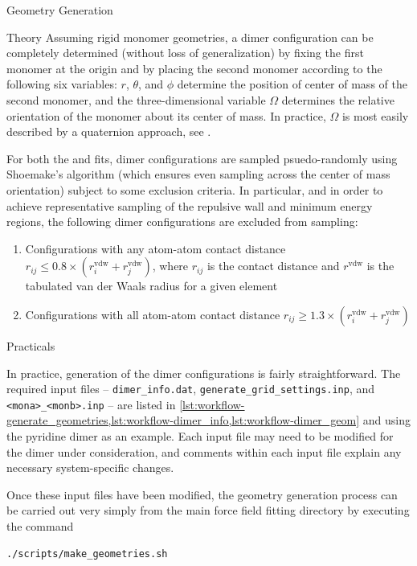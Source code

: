 \begin{section}{Geometry Generation}
\begin{subsection}{Theory}
Assuming rigid monomer geometries, a dimer configuration can be completely
determined (without loss of generalization) by fixing the first monomer at the
origin and by placing the second monomer according to the following six variables: $r$, $\theta$, and $\phi$ determine the position
of center of mass of the second monomer, and the three-dimensional variable $\Omega$ determines the relative
orientation of the monomer about its center of mass. In practice, $\Omega$ is
most easily described by a quaternion approach, see .

For both the \isaffold and \mastiff fits, dimer configurations are sampled
psuedo-randomly using Shoemake's algorithm\cite{Shoemake1992} (which ensures even sampling across
the center of mass orientation) subject to some exclusion criteria.
In particular, and in order to achieve representative sampling of the
repulsive wall and minimum energy regions, the following dimer configurations
are excluded from sampling:
\begin{enumerate}
\item Configurations with any atom-atom contact distance 
$r_{ij} \le 0.8\times(r^{\text{vdw}}_i + r^{\text{vdw}}_j)$, where $r_{ij}$ is the
contact distance and $r^{\text{vdw}}$ is the tabulated van der Waals radius
for a given element
\item Configurations with all atom-atom contact distance 
$r_{ij} \ge 1.3\times(r^{\text{vdw}}_i + r^{\text{vdw}}_j)$
\end{enumerate}


\end{subsection}
\begin{subsection}{Practicals}

In practice, generation of the dimer configurations is fairly straightforward.
The required input files -- \verb|dimer_info.dat|,
\verb|generate_grid_settings.inp|, and \verb|<mona>_<monb>.inp| --
are
listed  in
\cref{lst:workflow-generate_geometries,lst:workflow-dimer_info,lst:workflow-dimer_geom}
and using the pyridine dimer as an example.
Each input file may need to be modified for the dimer under consideration, and
comments within each input file explain any necessary system-specific changes.



Once these input files have been modified, the geometry generation process can
be carried out very simply from the main force field fitting directory by
executing the command

\begin{lstlisting}
./scripts/make_geometries.sh
\end{lstlisting}

\end{subsection}


\end{section}
